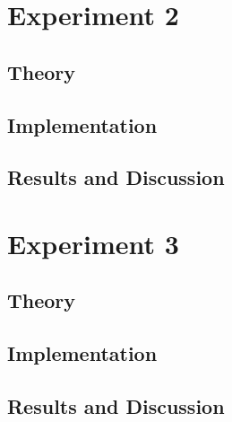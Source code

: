 \documentclass[headings=optiontoheadandtoc,listof=totoc,parskip=full]{scrartcl}
\begin{document}
\section{Experiment 2}
\label{sec:exp-2}

\subsection{Theory}


\subsection{Implementation}


\subsection{Results and Discussion}


\section{Experiment 3}
\label{sec:exp-3}

\subsection{Theory}


\subsection{Implementation}


\subsection{Results and Discussion}
\end{document}
